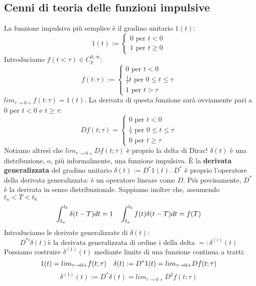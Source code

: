 \documentclass[11pt]{article}
\begin{document}
\subsection{Cenni di teoria delle funzioni impulsive}
La funzione impulsiva più semplice è il gradino unitario $1(t)$:
\begin{displaymath}
    1(t) := \begin{cases}
        0 \textrm{ per }t<0 \\
        1 \textrm{ per }t\ge0
    \end{cases}
\end{displaymath}
Introduciamo $f(t<\tau) \in C_p^{0,\infty}$:
\begin{displaymath}
    f(t:\tau) :=
    \begin{cases}
        0 \textrm{ per } t<0                           \\
        \frac{1}{\tau} t \textrm{ per }0\le t \le \tau \\
        1 \textrm{ per }t>\tau
    \end{cases}
\end{displaymath}
$lim_{\tau \rightarrow 0+} f(t:\tau) = 1(t)$.
La derivata di questa funzione sarà ovviamente pari a 0 per $t<0$ e $t\ge\tau$:
\begin{displaymath}
    Df(t;\tau) =
    \begin{cases}
        0 \textrm{ per } t<0                          \\
        \frac{1}{\tau} \textrm{ per } 0\le t \le \tau \\
        0 \textrm{ per }t\ge\tau
    \end{cases}
\end{displaymath}
Notiamo altresì che $lim_{\tau\rightarrow 0+} Df(t;\tau)$ è proprio la delta di Dirac!
$\delta(t)$ è una distribuzione, o, più informalmente, una funzione impulsiva. È la \textbf{derivata generalizzata} del gradino unitario $\delta(t) := D^*1(t)$. $D^*$ è proprio l'operatore della derivata generalizzata: è un operatore lineare come $D$. Più precisamente, $D^*$ è la derivata in senso distribuzionale. Sappiamo inoltre che, assumendo $t_a < T < t_b$
\begin{displaymath}
    \int_{t_a}^{t_b} \delta(t-T)dt = 1 \hspace{10px} \int_{t_a}^{t_b} f(t)\delta(t-T)dt = f(T)
\end{displaymath}
Introduciamo le derivate generalizzate di $\delta(t)$:
\begin{displaymath}
    D^{*i}\delta(t) \textrm{è la derivata generalizzata di ordine i della delta } =: \delta^{(i)}(t)
\end{displaymath}
Possiamo costruire $\delta^{(1)}(t)$ mediante limite di una funzione continua a tratti:
\begin{displaymath}
    1(t) = lim_{\tau\rightarrow0+}f(t;\tau) \hspace{10px} \delta(t):= D^* 1(t) = lim_{\tau\rightarrow0+} Df(t;\tau)
\end{displaymath}
\begin{displaymath}
    \delta^{(1)} (t) := D^* \delta(t) = lim_{\tau\rightarrow0+}D^2 f(t;\tau)
\end{displaymath}
\end{document}
